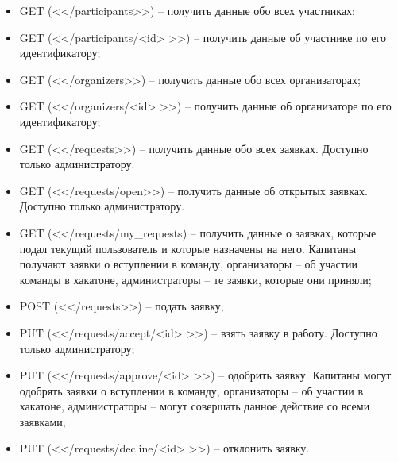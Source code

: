 \begin{itemize}
    \item GET (<</participants>>) -- получить данные обо всех участниках;
    \item GET (<</participants/<id> >>) -- получить данные об участнике по его идентификатору;
    \item GET (<</organizers>>) -- получить данные обо всех организаторах;
    \item GET (<</organizers/<id> >>) -- получить данные об организаторе по его идентификатору;
    \item GET (<</requests>>) -- получить данные обо всех заявках. Доступно только администратору.
    \item GET (<</requests/open>>) -- получить данные об открытых заявках. Доступно только администратору.
    \item GET (<</requests/my\_requests) -- получить данные о заявках, которые подал текущий пользователь и которые назначены на него. Капитаны получают заявки о вступлении в команду, организаторы -- об участии команды в хакатоне, администраторы -- те заявки, которые они приняли;
    \item POST (<</requests>>) -- подать заявку;
    \item PUT (<</requests/accept/<id> >>) -- взять заявку в работу. Доступно только администратору;
    \item PUT (<</requests/approve/<id> >>) -- одобрить заявку. Капитаны могут одобрять заявки о вступлении в команду, организаторы -- об участии в хакатоне, администраторы -- могут совершать данное действие со всеми заявками;
    \item PUT (<</requests/decline/<id> >>) -- отклонить заявку.
\end{itemize}
